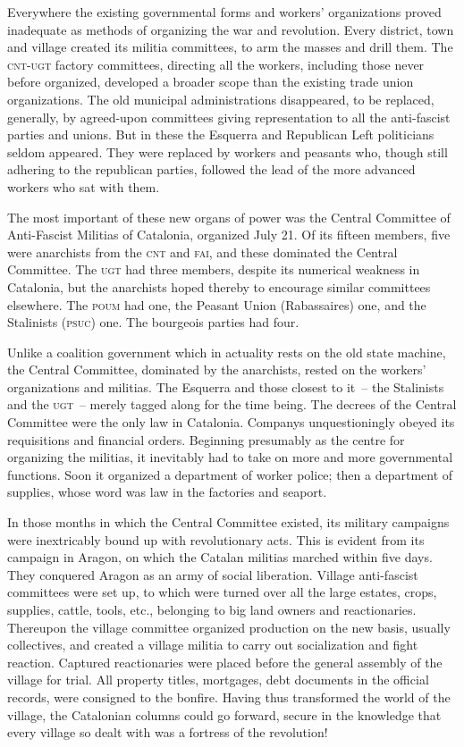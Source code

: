 Everywhere the existing governmental forms and workers’ organizations proved inadequate as methods of organizing the war and revolution. Every district, town and village created its militia committees, to arm the masses and drill them. The \textsc{cnt-ugt} factory committees, directing all the workers, including those never before organized, developed a broader scope than the existing trade union organizations. The old municipal administrations disappeared, to be replaced, generally, by agreed-upon committees giving representation to all the anti-fascist parties and unions. But in these the Esquerra and Republican Left politicians seldom appeared. They were replaced by workers and peasants who, though still adhering to the republican parties, followed the lead of the more advanced workers who sat with them.

The most important of these new organs of power was the Central Committee of Anti-Fascist Militias of Catalonia, organized July 21. Of its fifteen members, five were anarchists from the \textsc{cnt} and \textsc{fai}, and these dominated the Central Committee. The \textsc{ugt} had three members, despite its numerical weakness in Catalonia, but the anarchists hoped thereby to encourage similar committees elsewhere. The \textsc{poum} had one, the Peasant Union (Rabassaires) one, and the Stalinists (\textsc{psuc}) one. The bourgeois parties had four.

Unlike a coalition government which in actuality rests on the old state machine, the Central Committee, dominated by the anarchists, rested on the workers’ organizations and militias. The Esquerra and those closest to it~-- the Stalinists and the \textsc{ugt}~-- merely tagged along for the time being. The decrees of the Central Committee were the only law in Catalonia. Companys unquestioningly obeyed its requisitions and financial orders. Beginning presumably as the centre for organizing the militias, it inevitably had to take on more and more governmental functions. Soon it organized a department of worker police; then a department of supplies, whose word was law in the factories and seaport.

In those months in which the Central Committee existed, its military campaigns were inextricably bound up with revolutionary acts. This is evident from its campaign in Aragon, on which the Catalan militias marched within five days. They conquered Aragon as an army of social liberation. Village anti-fascist committees were set up, to which were turned over all the large estates, crops, supplies, cattle, tools, etc., belonging to big land owners and reactionaries. Thereupon the village committee organized production on the new basis, usually collectives, and created a village militia to carry out socialization and fight reaction. Captured reactionaries were placed before the general assembly of the village for trial. All property titles, mortgages, debt documents in the official records, were consigned to the bonfire. Having thus transformed the world of the village, the Catalonian columns could go forward, secure in the knowledge that every village so dealt with was a fortress of the revolution!

